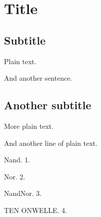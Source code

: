 \documentclass{article}
\begin{document}
\section{Title}



\subsection{Subtitle}

Plain text.

And another sentence.

\subsection{Another subtitle}

More plain text.

And another line of plain text.

Nand. 1.

Nor. 2.

NandNor. 3.

TEN ONWELLE. 4.
\end{document}
